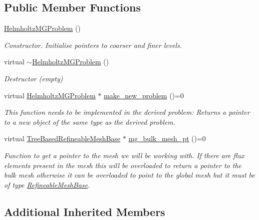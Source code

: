 \subsection*{Public Member Functions}
\begin{DoxyCompactItemize}
\item 
\hyperlink{classoomph_1_1HelmholtzMGProblem_ab74fba72dcdfc8f448a992944764cd4c}{Helmholtz\+M\+G\+Problem} ()
\begin{DoxyCompactList}\small\item\em Constructor. Initialise pointers to coarser and finer levels. \end{DoxyCompactList}\item 
virtual \hyperlink{classoomph_1_1HelmholtzMGProblem_a0cc940bfc51d6e95e420b60938640e54}{$\sim$\+Helmholtz\+M\+G\+Problem} ()
\begin{DoxyCompactList}\small\item\em Destructor (empty) \end{DoxyCompactList}\item 
virtual \hyperlink{classoomph_1_1HelmholtzMGProblem}{Helmholtz\+M\+G\+Problem} $\ast$ \hyperlink{classoomph_1_1HelmholtzMGProblem_aba0155964004b8fea5975957e0892863}{make\+\_\+new\+\_\+problem} ()=0
\begin{DoxyCompactList}\small\item\em This function needs to be implemented in the derived problem\+: Returns a pointer to a new object of the same type as the derived problem. \end{DoxyCompactList}\item 
virtual \hyperlink{classoomph_1_1TreeBasedRefineableMeshBase}{Tree\+Based\+Refineable\+Mesh\+Base} $\ast$ \hyperlink{classoomph_1_1HelmholtzMGProblem_aeae03594fd61961d0f62aef58ae97a92}{mg\+\_\+bulk\+\_\+mesh\+\_\+pt} ()=0
\begin{DoxyCompactList}\small\item\em Function to get a pointer to the mesh we will be working with. If there are flux elements present in the mesh this will be overloaded to return a pointer to the bulk mesh otherwise it can be overloaded to point to the global mesh but it must be of type \hyperlink{classoomph_1_1RefineableMeshBase}{Refineable\+Mesh\+Base}. \end{DoxyCompactList}\end{DoxyCompactItemize}
\subsection*{Additional Inherited Members}


